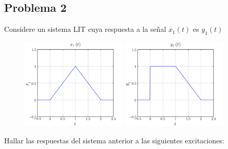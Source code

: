 \documentclass[a4paper,12pt,final]{article}
\begin{document}
  \newpage
  \subsection*{Problema 2}
    \noindent Considere un sistema LIT cuya respuesta a la señal $x_1\left(t\right)$ es $y_1\left(t\right)$

    \begin{figure}[H]
      \begin{center}
        \includegraphics[width=0.45\textwidth]{./laboratorio_3/problema02_X1.png}
        \includegraphics[width=0.45\textwidth]{./laboratorio_3/problema02_Y1.png}
      \end{center}
    \end{figure}

    \noindent Hallar las respuestas del sistema anterior a las siguientes excitaciones:
\end{document}
